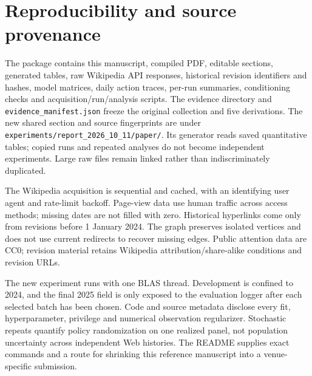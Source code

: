 \section{Reproducibility and source provenance}

The package contains this manuscript, compiled PDF, editable sections, generated tables, raw Wikipedia API responses, historical revision identifiers and hashes, model matrices, daily action traces, per-run summaries, conditioning checks and acquisition/run/analysis scripts. The evidence directory and \texttt{evidence\_manifest.json} freeze the original collection and five derivations. The new shared section and source fingerprints are under \texttt{experiments/report\_2026\_10\_11/paper/}. Its generator reads saved quantitative tables; copied runs and repeated analyses do not become independent experiments. Large raw files remain linked rather than indiscriminately duplicated.

The Wikipedia acquisition is sequential and cached, with an identifying user agent and rate-limit backoff. Page-view data use human traffic across access methods; missing dates are not filled with zero. Historical hyperlinks come only from revisions before 1 January 2024. The graph preserves isolated vertices and does not use current redirects to recover missing edges. Public attention data are CC0; revision material retains Wikipedia attribution/share-alike conditions and revision URLs.

The new experiment runs with one BLAS thread. Development is confined to 2024, and the final 2025 field is only exposed to the evaluation logger after each selected batch has been chosen. Code and source metadata disclose every fit, hyperparameter, privilege and numerical observation regularizer. Stochastic repeats quantify policy randomization on one realized panel, not population uncertainty across independent Web histories. The README supplies exact commands and a route for shrinking this reference manuscript into a venue-specific submission.
